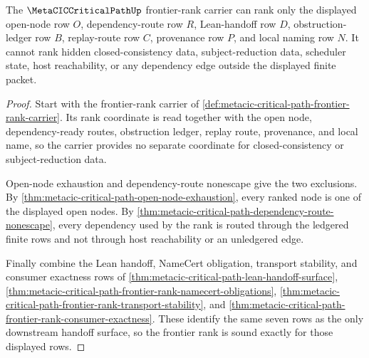 \begin{theorem}
\label{thm:metacic-critical-path-frontier-rank-soundness}
The $\MetaCICCriticalPathUp$ frontier-rank carrier can rank only the displayed open-node row $O$, dependency-route row $R$, Lean-handoff row $D$, obstruction-ledger row $B$, replay-route row $C$, provenance row $P$, and local naming row $N$. It cannot rank hidden closed-consistency data, subject-reduction data, scheduler state, host reachability, or any dependency edge outside the displayed finite packet.
\end{theorem}
\begin{proof}
Start with the frontier-rank carrier of \autoref{def:metacic-critical-path-frontier-rank-carrier}. Its rank coordinate is read together with the open node, dependency-ready routes, obstruction ledger, replay route, provenance, and local name, so the carrier provides no separate coordinate for closed-consistency or subject-reduction data.

Open-node exhaustion and dependency-route nonescape give the two exclusions. By \autoref{thm:metacic-critical-path-open-node-exhaustion}, every ranked node is one of the displayed open nodes. By \autoref{thm:metacic-critical-path-dependency-route-nonescape}, every dependency used by the rank is routed through the ledgered finite rows and not through host reachability or an unledgered edge.

Finally combine the Lean handoff, NameCert obligation, transport stability, and consumer exactness rows of \autoref{thm:metacic-critical-path-lean-handoff-surface}, \autoref{thm:metacic-critical-path-frontier-rank-namecert-obligations}, \autoref{thm:metacic-critical-path-frontier-rank-transport-stability}, and \autoref{thm:metacic-critical-path-frontier-rank-consumer-exactness}. These identify the same seven rows as the only downstream handoff surface, so the frontier rank is sound exactly for those displayed rows.
\end{proof}

